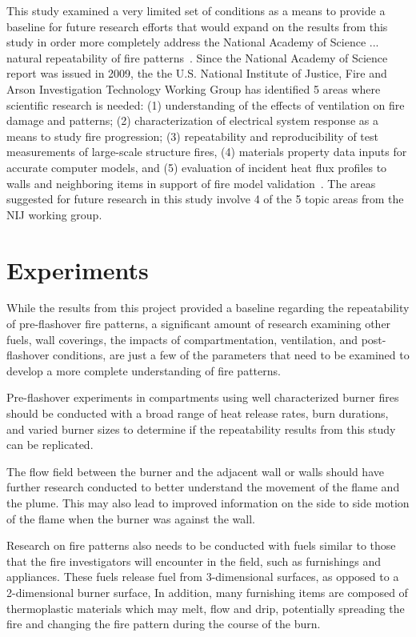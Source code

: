 \documentclass[twoside]{uocthesis}
\begin{document}
{This study examined a very limited set of conditions as a means to provide a baseline for future research efforts that would expand on the results from this study in order more completely address the National Academy of Science ...   natural repeatability of fire patterns~\cite{Forensic:2009}.   Since the National Academy of Science report was issued in 2009, the  the U.S. National Institute of Justice, Fire and Arson Investigation Technology Working Group has identified 5 areas where scientific research is needed: (1) understanding of the effects of ventilation on fire damage and patterns; (2) characterization of electrical system response as a means to study fire progression; (3) repeatability and reproducibility of test measurements of large-scale structure fires, (4) materials property data inputs for accurate computer models, and (5) evaluation of incident heat flux profiles to walls and neighboring items in support of fire model validation~\cite{NIJ:2016}.  The areas suggested for future research in this study involve 4 of the 5 topic areas from the NIJ working group.   

\section{Experiments}

While the results from this project provided a baseline regarding the repeatability of pre-flashover fire patterns, a significant amount of research examining other fuels, wall coverings, the impacts of compartmentation, ventilation, and post-flashover conditions, are just a few of the parameters that need to be examined to develop a more complete understanding of fire patterns.

Pre-flashover experiments in compartments using well characterized burner fires should be conducted with a broad range of heat release rates, burn durations, and varied burner sizes to determine if the repeatability results from this study can be replicated. 

The flow field between the burner and the adjacent wall or walls should have further research conducted to better understand the movement of the flame and the plume.  This may also lead to improved information on the side to side motion of the flame when the burner was against the wall.  

Research on fire patterns also needs to be conducted with fuels similar to those that the fire investigators will encounter in the field, such as furnishings and appliances. 
These fuels release fuel from 3-dimensional surfaces, as opposed to a 2-dimensional burner surface,  In addition, many furnishing items are composed of thermoplastic materials which may melt, flow and drip, potentially spreading the fire and changing the fire pattern during the course of the burn.

}
\end{document}
